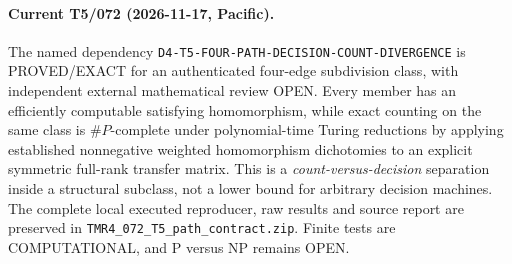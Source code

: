 \documentclass[11pt]{article}
\begin{document}
\paragraph{Current T5/072 (2026-11-17, Pacific).}
The named dependency \texttt{D4-T5-FOUR-PATH-DECISION-COUNT-DIVERGENCE}
is PROVED/EXACT for an authenticated four-edge subdivision class,
with independent external mathematical review OPEN. Every member
has an efficiently computable satisfying homomorphism, while exact
counting on the same class is \(\#P\)-complete under polynomial-time
Turing reductions by applying established nonnegative weighted
homomorphism dichotomies to an explicit symmetric full-rank transfer
matrix. This is a \emph{count-versus-decision} separation inside
a structural subclass, not a lower bound for arbitrary decision
machines. The complete local executed reproducer, raw results and
source report are preserved in \texttt{TMR4\_072\_T5\_path\_contract.zip}.
Finite tests are COMPUTATIONAL, and P versus NP remains OPEN.
\end{document}
